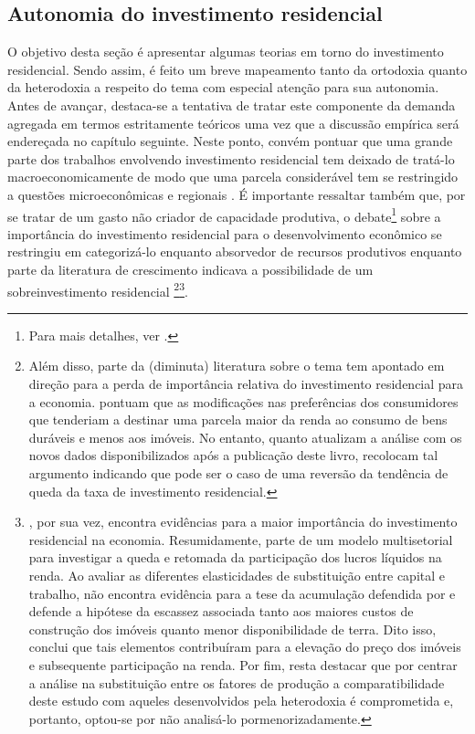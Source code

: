 \subsection{Autonomia do investimento residencial}
\label{RevResidencial}

O objetivo desta seção é apresentar algumas teorias em torno do investimento residencial. 
Sendo assim, é feito um breve mapeamento tanto da ortodoxia quanto da heterodoxia a respeito do tema com especial atenção para sua autonomia.
Antes de avançar, destaca-se a tentativa de tratar este componente da demanda agregada em termos estritamente teóricos uma vez que a discussão empírica será endereçada no capítulo seguinte. 
Neste ponto, convém pontuar que uma grande parte dos trabalhos envolvendo investimento residencial tem deixado de tratá-lo macroeconomicamente de modo que uma parcela considerável tem se restringido a questões microeconômicas e regionais \cite{arestis_u.s._2008}.
É importante ressaltar também que, por se tratar de um gasto não criador de capacidade produtiva, o debate\footnote{Para mais detalhes, ver \textcite{arku_housing_2006}.} sobre a importância do investimento residencial para o desenvolvimento econômico se restringiu em categorizá-lo enquanto absorvedor de recursos produtivos \cite{solow_importance_1995} enquanto parte da literatura de crescimento indicava  a possibilidade de um sobreinvestimento residencial \cite{mills_has_1987}
\footnote{Além disso, parte da (diminuta) literatura sobre o tema tem apontado em direção para a perda de importância relativa do investimento residencial para a economia. \textcite[p.~134-142]{grebler_capital_1956} pontuam que as modificações nas preferências dos consumidores que tenderiam a destinar uma parcela maior da renda ao consumo de bens duráveis e menos aos imóveis. No entanto, quanto atualizam a análise com os novos dados disponibilizados após a publicação deste livro, recolocam tal argumento indicando que pode ser o caso de uma reversão da tendência de queda da taxa de investimento residencial.
}\footnote{
	\textcite{rognlie_deciphering_2016}, por sua vez, encontra evidências para a maior importância do investimento residencial na economia.
	Resumidamente, parte de um modelo multisetorial para investigar a queda e retomada da participação dos lucros líquidos na renda.
	Ao avaliar as diferentes elasticidades de substituição entre capital e trabalho, não encontra evidência para a tese da acumulação defendida por \textcite{piketty_o_2014} e defende a hipótese da escassez associada tanto aos maiores custos de construção dos imóveis quanto menor disponibilidade de terra.
	Dito isso, conclui que tais elementos contribuíram para a elevação do preço dos imóveis e subsequente participação na renda.
	Por fim, resta destacar que por centrar a análise na substituição entre os fatores de produção a comparatibilidade deste estudo com aqueles desenvolvidos pela heterodoxia é comprometida e, portanto, optou-se por não analisá-lo pormenorizadamente.
}.

